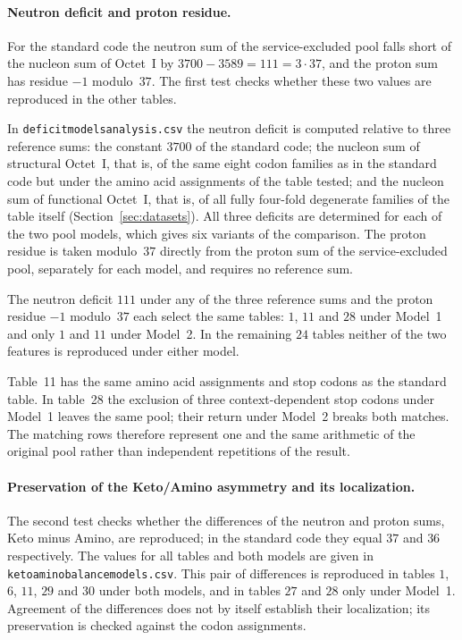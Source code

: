 \documentclass[11pt,a4paper]{article}
\renewcommand{\_}{\origunderscore\allowbreak}
\begin{document}
\paragraph{Neutron deficit and proton residue.}
For the standard code the neutron sum of the service-excluded pool
falls short of the nucleon sum of Octet~I by
$3700-3589=111=3\cdot37$, and the proton
sum has residue $-1$ modulo~$37$. The first test checks whether
these two values are reproduced in the other tables.

In \texttt{deficit\_models\_analysis.csv} the neutron deficit is
computed relative to three reference
sums: the constant $3700$ of the standard code; the nucleon sum of
structural Octet~I, that is, of the same eight codon families as
in the standard code but under the amino acid assignments of the
table tested; and the nucleon sum of functional Octet~I, that is,
of all fully four-fold degenerate families of the table itself
(Section~\ref{sec:datasets}). All three deficits are determined
for each of the two pool
models, which gives six variants of the comparison. The proton
residue is taken modulo~$37$ directly from the proton sum of the
service-excluded pool, separately for each model, and requires no
reference sum.

The neutron deficit $111$ under any of the three reference sums
and
the proton residue $-1$ modulo~$37$ each select the same tables:
$1$, $11$ and $28$ under Model~1 and only $1$ and $11$ under
Model~2.
In the remaining $24$ tables neither of the two features is
reproduced under either model.

Table~11 has the same amino acid assignments and stop codons as
the standard table. In table~28 the exclusion of three
context-dependent stop codons under Model~1 leaves the same pool;
their return under Model~2 breaks both matches. The matching rows
therefore represent one and the same arithmetic of the original
pool rather than independent repetitions of the result.

\paragraph{Preservation of the Keto/Amino asymmetry and its localization.}
The second test checks whether the differences of the neutron and
proton sums, Keto minus Amino, are reproduced; in the standard
code they equal $37$ and $36$ respectively. The values for all
tables and both models are given in
\texttt{keto\_amino\_balance\_models.csv}. This pair of
differences
is reproduced in tables $1$, $6$, $11$, $29$ and $30$ under both
models, and in tables $27$ and $28$ only under Model~1. Agreement
of
the differences does not by itself establish their localization;
its preservation is checked against the codon assignments.
\end{document}
